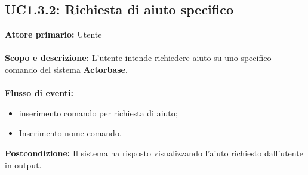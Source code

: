 \documentclass{scalatekids-article}
\begin{document}
\subsection{UC1.3.2: Richiesta di aiuto specifico}
\textbf{Attore primario:} Utente\\ \\
\textbf{Scopo e descrizione:} L'utente intende richiedere aiuto su uno specifico comando del sistema \textbf{Actorbase}.\\ \\
\textbf{Flusso di eventi:}
\begin{itemize}
\item inserimento comando per richiesta di aiuto;
\item Inserimento nome comando.
\end{itemize}
\textbf{Postcondizione:} Il sistema ha risposto visualizzando l'aiuto richiesto dall'utente in output.
\end{document}
